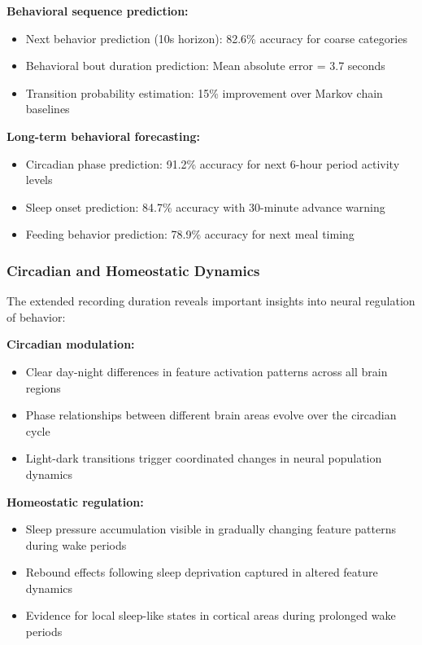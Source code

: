 \textbf{Behavioral sequence prediction:}
\begin{itemize}
\item Next behavior prediction (10s horizon): 82.6\% accuracy for coarse categories
\item Behavioral bout duration prediction: Mean absolute error = 3.7 seconds
\item Transition probability estimation: 15\% improvement over Markov chain baselines
\end{itemize}

\textbf{Long-term behavioral forecasting:}
\begin{itemize}
\item Circadian phase prediction: 91.2\% accuracy for next 6-hour period activity levels
\item Sleep onset prediction: 84.7\% accuracy with 30-minute advance warning
\item Feeding behavior prediction: 78.9\% accuracy for next meal timing
\end{itemize}

\subsubsection{Circadian and Homeostatic Dynamics}

The extended recording duration reveals important insights into neural regulation of behavior:

\textbf{Circadian modulation:}
\begin{itemize}
\item Clear day-night differences in feature activation patterns across all brain regions
\item Phase relationships between different brain areas evolve over the circadian cycle
\item Light-dark transitions trigger coordinated changes in neural population dynamics
\end{itemize}

\textbf{Homeostatic regulation:}
\begin{itemize}
\item Sleep pressure accumulation visible in gradually changing feature patterns during wake periods
\item Rebound effects following sleep deprivation captured in altered feature dynamics
\item Evidence for local sleep-like states in cortical areas during prolonged wake periods
\end{itemize}

